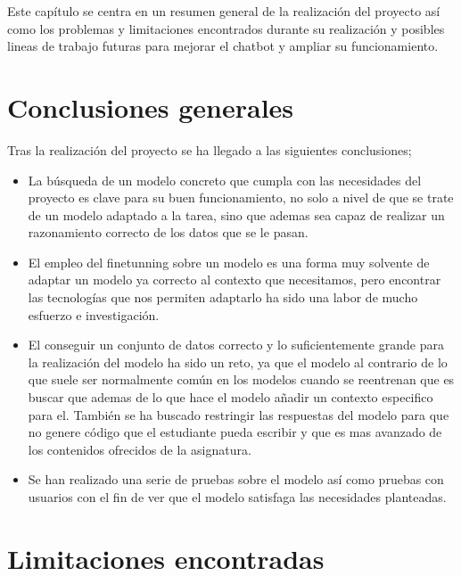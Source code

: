 
Este capítulo se centra en un resumen general de la realización del proyecto así como los problemas y limitaciones encontrados durante su realización y posibles lineas de trabajo futuras para mejorar el chatbot y ampliar su funcionamiento.

\section{Conclusiones generales}

Tras la realización del proyecto se ha llegado a las siguientes conclusiones;

\begin{itemize}
    \item La búsqueda de un modelo concreto que cumpla con las necesidades del proyecto es clave para su buen funcionamiento, no solo a nivel de que se trate de un modelo adaptado a la tarea, sino que ademas sea capaz de realizar un razonamiento correcto de los datos que se le pasan.

    \item El empleo del finetunning sobre un modelo es una forma muy solvente de adaptar un modelo ya correcto al contexto que necesitamos, pero encontrar las tecnologías que nos permiten adaptarlo ha sido una labor de mucho esfuerzo e investigación.

    \item El conseguir un conjunto de datos correcto y lo suficientemente grande para la realización del modelo ha sido un reto, ya que el modelo al contrario de lo que suele ser normalmente común en los modelos cuando se reentrenan que es buscar que ademas de lo que hace el modelo añadir un contexto especifico para el. También se ha buscado restringir las respuestas del modelo para que no genere código que el estudiante pueda escribir y que es mas avanzado de los contenidos ofrecidos de la asignatura.

    \item Se han realizado una serie de pruebas sobre el modelo así como pruebas con usuarios con el fin de ver que el modelo satisfaga las necesidades planteadas.
\end{itemize}

\section{Limitaciones encontradas}

